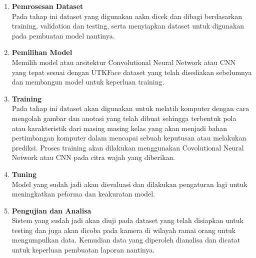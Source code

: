 \begin{enumerate}
   \item \textbf{Pemrosesan Dataset} \\
   Pada tahap ini dataset yang digunakan aakn dicek dan dibagi berdasarkan training, validation dan 
   testing, serta menyiapkan dataset untuk digunakan pada pembuatan model nantinya.
   \item \textbf{Pemilihan Model} \\
   Memilih model atau arsitektur Convolutional Neural Network atau CNN yang tepat sesuai dengan UTKFace 
   dataset yang telah disediakan sebelumnya dan membangun model untuk keperluan training.
   \item \textbf{Training} \\
   Pada tahap ini dataset akan digunakan untuk melatih komputer dengan cara mengolah gambar dan anotasi 
   yang telah dibuat sehingga terbentuk pola atau karakteristik dari masing masing kelas yang akan 
   menjadi bahan pertimbangan komputer dalam mencapai sebuah keputusan atau melakukan prediksi. 
   Proses training akan dilakukan menggunakan Covolutional Neural Network atau CNN pada citra wajah 
   yang diberikan.
   \item \textbf{Tuning} \\
   Model yang sudah jadi akan dievaluasi dan dilakukan pengaturan lagi untuk meningkatkan peforma dan 
   keakuratan model.
   \item \textbf{Pengujian dan Analisa} \\
   Sistem yang sudah jadi akan diuji pada dataset yang telah disiapkan untuk testing dan juga akan dicoba 
   pada kamera di wilayah ramai orang untuk mengumpulkan data. Kemudian data yang diperoleh dianalisa 
   dan dicatat untuk keperluan pembuatan laporan nantinya.
\end{enumerate}